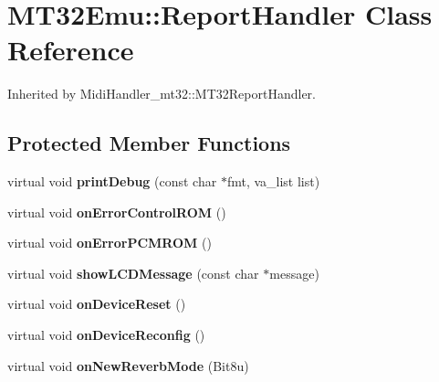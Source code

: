 \hypertarget{classMT32Emu_1_1ReportHandler}{\section{M\-T32\-Emu\-:\-:Report\-Handler Class Reference}
\label{classMT32Emu_1_1ReportHandler}
}


Inherited by Midi\-Handler\-\_\-mt32\-::\-M\-T32\-Report\-Handler.

\subsection*{Protected Member Functions}
\begin{DoxyCompactItemize}
\item 
\hypertarget{classMT32Emu_1_1ReportHandler_a47c45aec4115b841d949b591cf6a2059}{virtual void {\bfseries print\-Debug} (const char $\ast$fmt, va\-\_\-list list)}\label{classMT32Emu_1_1ReportHandler_a47c45aec4115b841d949b591cf6a2059}

\item 
\hypertarget{classMT32Emu_1_1ReportHandler_a736f02f360ccba761eb99e5c6962e29d}{virtual void {\bfseries on\-Error\-Control\-R\-O\-M} ()}\label{classMT32Emu_1_1ReportHandler_a736f02f360ccba761eb99e5c6962e29d}

\item 
\hypertarget{classMT32Emu_1_1ReportHandler_ad1585bd9e1c794d5457364f102c5e969}{virtual void {\bfseries on\-Error\-P\-C\-M\-R\-O\-M} ()}\label{classMT32Emu_1_1ReportHandler_ad1585bd9e1c794d5457364f102c5e969}

\item 
\hypertarget{classMT32Emu_1_1ReportHandler_a1f676814c614873bbb3af769e1d2507a}{virtual void {\bfseries show\-L\-C\-D\-Message} (const char $\ast$message)}\label{classMT32Emu_1_1ReportHandler_a1f676814c614873bbb3af769e1d2507a}

\item 
\hypertarget{classMT32Emu_1_1ReportHandler_a7aee81bc2b33ddd0c008fbe6d86a43fe}{virtual void {\bfseries on\-Device\-Reset} ()}\label{classMT32Emu_1_1ReportHandler_a7aee81bc2b33ddd0c008fbe6d86a43fe}

\item 
\hypertarget{classMT32Emu_1_1ReportHandler_ac3628ae75ffbd2b30156422484817cd9}{virtual void {\bfseries on\-Device\-Reconfig} ()}\label{classMT32Emu_1_1ReportHandler_ac3628ae75ffbd2b30156422484817cd9}

\item 
\hypertarget{classMT32Emu_1_1ReportHandler_a89577c12c798625fc281fb7d9e28ac56}{virtual void {\bfseries on\-New\-Reverb\-Mode} (Bit8u)}\label{classMT32Emu_1_1ReportHandler_a89577c12c798625fc281fb7d9e28ac56}


\end{DoxyCompactItemize}
